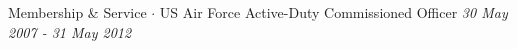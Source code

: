 
\begin{rSection}{Membership \& Service}
  $\cdot$ US Air Force Active-Duty Commissioned Officer
  \hfill {\em 30 May 2007 - 31 May 2012}
\end{rSection}

